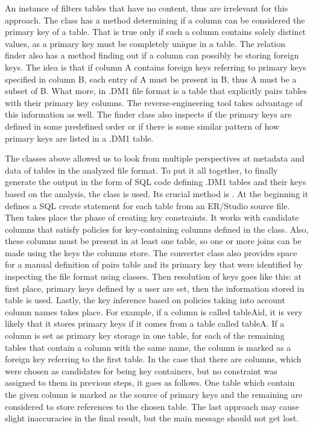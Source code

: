 An instance of  filters tables that have no content, thus are irrelevant for this approach.
The class has a method determining if a column can be considered the primary key of a table. 
That is true only if such a column contains solely distinct values, as a primary key must be completely unique in a table.
The relation finder also has a method finding out if a column can possibly be storing foreign keys. The idea is that if column A contains foreign keys referring to primary keys specified in column B, each entry of A must be present in B, thus A must be a subset of B.
What more, in .DM1 file format is a table  that explicitly pairs tables with their primary key columns. 
The reverse-engineering tool takes advantage of this information as well.
The finder class also inspects if the primary keys are defined in some predefined order or if there is some similar pattern of how primary keys are listed in a .DM1 table.

The classes above allowed us to look from multiple perspectives at metadata and data of tables in the analyzed file format.
To put it all together, to finally generate the output in the form of SQL code defining .DM1 tables and their keys based on the analysis, the class  is used.
Its crucial method is . 
At the beginning it defines a SQL create statement for each table from an ER/Studio source file. 
Then takes place the phase of creating key constraints. 
It works with candidate columns that satisfy policies for key-containing columns defined in the  class.
Also, these columns must be present in at least one table, so one or more joins can be made using the keys the columns store.
The converter class also provides space for a manual definition of pairs table and its primary key that were identified by inspecting the file format using  classes.
Then resolution of keys goes like this: at first place, primary keys defined by a user are set, then the information stored in  table is used. Lastly, the key inference based on policies taking into account column names takes place. 
For example, if a column is called tableA\textunderscore id, it is very likely that it stores primary keys if it comes from a table called tableA.
If a column is set as primary key storage in one table, for each of the remaining tables that contain a column with the same name, the column is marked as a foreign key referring to the first table.
In the case that there are columns, which were chosen as candidates for being key containers, but no constraint was assigned to them in previous steps, it goes as follows. 
One table which contain the given column is marked as the source of primary keys and the remaining are considered to store references to the chosen table. The last approach may cause slight inaccuracies in the final result, but the main message should not get lost.

